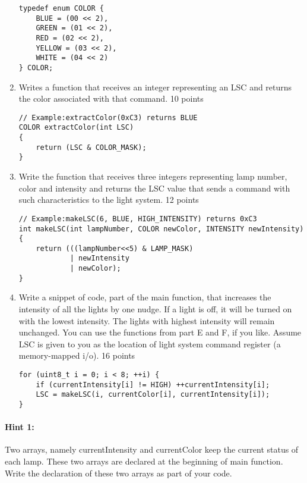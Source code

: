 \documentclass[12pt,letterpaper,titlepage]{article}
\begin{document}
\begin{raggedright}
\begin{enumerate}[label=\Alph*.]
\begin{lstlisting}
typedef enum COLOR {
	BLUE = (00 << 2),
	GREEN = (01 << 2),
	RED = (02 << 2),
	YELLOW = (03 << 2),
	WHITE = (04 << 2)
} COLOR;
\end{lstlisting}
\item Writes a function that receives an integer representing an LSC and returns the color associated with that command. 10 points
\begin{lstlisting}
// Example:extractColor(0xC3) returns BLUE 
COLOR extractColor(int LSC)
{
    return (LSC & COLOR_MASK);
}
\end{lstlisting}
\item Write the function that receives three integers representing lamp number, color and intensity and returns the LSC value that sends a command with such characteristics to the light system. 12 points 
\begin{lstlisting}
// Example:makeLSC(6, BLUE, HIGH_INTENSITY) returns 0xC3
int makeLSC(int lampNumber, COLOR newColor, INTENSITY newIntensity)
{
	return (((lampNumber<<5) & LAMP_MASK)
            | newIntensity 
            | newColor);
}
\end{lstlisting}

\pagebreak

\item Write a snippet of code, part of the main function, that increases the intensity of all the lights by one nudge. If a light is off, it will be turned on with the lowest intensity. The lights with highest intensity will remain unchanged. You can use the functions from part E and F, if you like. Assume LSC is given to you as the location of light system command register (a memory-mapped i/o). 16 points
\begin{lstlisting}
for (uint8_t i = 0; i < 8; ++i) {
	if (currentIntensity[i] != HIGH) ++currentIntensity[i];
	LSC = makeLSC(i, currentColor[i], currentIntensity[i]);
}
\end{lstlisting}
\end{enumerate}


\paragraph{Hint 1: }
Two arrays, namely currentIntensity and currentColor keep the current status of each lamp. These two arrays are declared at the beginning of main function. Write the declaration of these two arrays as part of your code. 


\end{raggedright}
\end{document}
